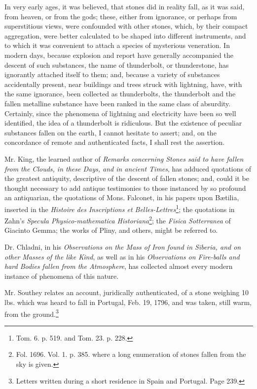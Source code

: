 \documentclass[a4paper, 12pt, oneside, twocolumn]{article}
\begin{document}
In very early ages, it was believed, that stones did in reality fall, as it was said, from heaven, or from the gods; these, either from ignorance, or perhaps from superstitious views, were confounded with other stones, which, by their compact aggregation, were better calculated to be shaped into different instruments, and to which it was convenient to attach a species of mysterious veneration. In modern days, because explosion and report have generally accompanied the descent of such substances, the name of thunderbolt, or thunderstone, has ignorantly attached itself to them; and, because a variety of substances accidentally present, near buildings and trees struck with lightning, have, with the same ignorance, been collected as thunderbolts, the thunderbolt and the fallen metalline substance have been ranked in the same class of absurdity. Certainly, since the phenomena of lightning and electricity have been so well identified, the idea of a thunderbolt is ridiculous. But the existence of peculiar substances fallen on the earth, I cannot hesitate to assert; and, on the concordance of remote and authenticated facts, I shall rest the assertion.

Mr. King, the learned author of \emph{Remarks concerning Stones said to have fallen from the Clouds, in these Days, and in ancient Times}, has adduced quotations of the greatest antiquity, descriptive of the descent of fallen stones; and, could it be thought necessary to add antique testimonies to those instanced by so profound an antiquarian, the quotations of Mons. Falconet, in his papers upon Bætilia, inserted in the \emph{Histoire des Inscriptions et Belles-Lettres}\footnote{Tom. 6. p. 519. and Tom. 23. p. 228.}; the quotations in Zahn's \emph{Specula Physico-mathematica Historiana}\footnote{Fol. 1696. Vol. 1. p. 385. where a long enumeration of stones fallen from the sky is given.}; the \emph{Fisica Sotterranea} of Giacinto Gemma; the works of Pliny, and others, might be referred to.

Dr. Chladni, in his \emph{Observations on the Mass of Iron found in Siberia, and on other Masses of the like Kind}, as well as in his \emph{Observations on Fire-balls and hard Bodies fallen from the Atmosphere}, has collected almost every modern instance of phenomena of this nature.

Mr. Southey relates an account, juridically authenticated, of a stone weighing 10 lbs. which was heard to fall in Portugal, Feb. 19, 1796, and was taken, still warm, from the ground.\footnote{Letters written during a short residence in Spain and Portugal. Page 239.}
\end{document}

